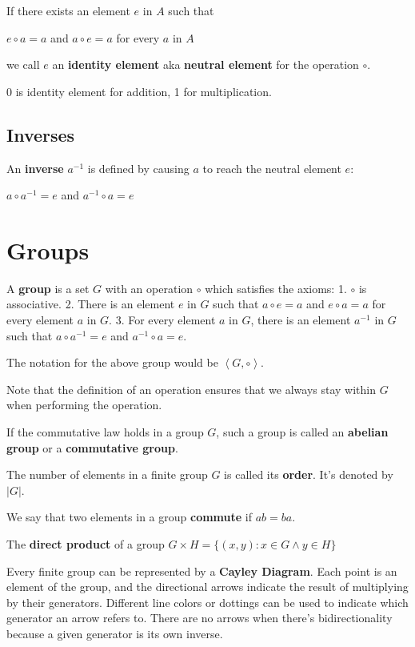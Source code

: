 \documentclass[11pt]{article}
\begin{document}
If there exists an element \(e\) in \(A\) such that

\(e \circ a = a\) and \(a \circ e = a\) for every \(a\) in \(A\)

we call \(e\) an \textbf{identity element} aka \textbf{neutral element}
for the operation \(\circ\).

0 is identity element for addition, 1 for multiplication.

\subsection{Inverses}\label{inverses}

An \textbf{inverse} \(a^{-1}\) is defined by causing \(a\) to reach the
neutral element \(e\):

\(a \circ a^{-1} = e\) and \(a^{-1} \circ a = e\)

    \section{Groups}\label{groups}

A \textbf{group} is a set \(G\) with an operation \(\circ\) which
satisfies the axioms: 1. \(\circ\) is associative. 2. There is an
element \(e\) in \(G\) such that \(a \circ e = a\) and \(e \circ a = a\)
for every element \(a\) in \(G\). 3. For every element \(a\) in \(G\),
there is an element \(a^{-1}\) in \(G\) such that \(a \circ a^{-1} = e\)
and \(a^{-1} \circ a = e\).

The notation for the above group would be \(\left<G, \circ\right>\).

Note that the definition of an operation ensures that we always stay
within \(G\) when performing the operation.

If the commutative law holds in a group \(G\), such a group is called an
\textbf{abelian group} or a \textbf{commutative group}.

The number of elements in a finite group \(G\) is called its
\textbf{order}. It's denoted by \(|G|\).

We say that two elements in a group \textbf{commute} if \(ab = ba\).

The \textbf{direct product} of a group
\(G \times H = \{(x, y) : x \in G \land y \in H\}\)

Every finite group can be represented by a \textbf{Cayley Diagram}. Each
point is an element of the group, and the directional arrows indicate
the result of multiplying by their generators. Different line colors or
dottings can be used to indicate which generator an arrow refers to.
There are no arrows when there's bidirectionality because a given
generator is its own inverse.
\end{document}
